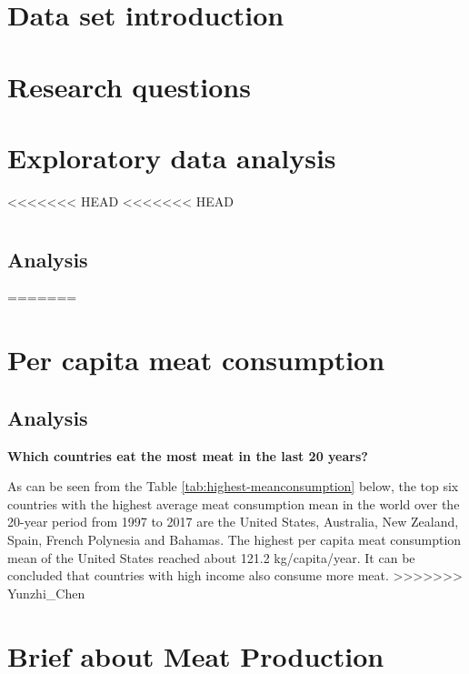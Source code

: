 \documentclass[11pt,a4paper,]{article}
\author{\sf\Large\textbf{ Di Cui}\\ {\sf\large Master of Business Analytics\\[0.5cm]} \sf\Large\textbf{ Guanru Chen}\\ {\sf\large Master of Business Analytics\\[0.5cm]} \sf\Large\textbf{ Yunzhi Chen}\\ {\sf\large Master of Business Analytics\\[0.5cm]}}
\date{\sf\Date~\Month~\Year}
\begin{document}
\hypertarget{data-set-introduction}{%
\section{Data set introduction}\label{data-set-introduction}}

\hypertarget{research-questions}{%
\section{Research questions}\label{research-questions}}

\clearpage

\hypertarget{exploratory-data-analysis}{%
\section{Exploratory data analysis}\label{exploratory-data-analysis}}

<<<<<<< HEAD
<<<<<<< HEAD
\section*{}

\subsection*{Analysis}

\clearpage
=======
\clearpage

\section*{Per capita meat consumption}

\subsection*{Analysis}

\textbf{Which countries eat the most meat in the last 20 years? }

As can be seen from the Table \ref{tab:highest-meanconsumption} below, the top six countries with the highest average meat consumption mean in the world over the 20-year period from 1997 to 2017 are the United States, Australia, New Zealand, Spain, French Polynesia and Bahamas. The highest per capita meat consumption mean of the United States reached about 121.2 kg/capita/year. It can be concluded that countries with high income also consume more meat.
>>>>>>> Yunzhi_Chen

\section*{Brief about Meat Production}
\end{document}
